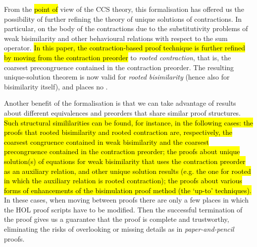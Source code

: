 From the \hl{point of} view of the CCS theory, this formalisation has offered us the possibility of
further refining the theory of unique solutions of contractions.
In particular,  on the body of the contractions due to the
substitutivity problems of weak bisimilarity and other behavioural relations with respect
to the sum operator.
\hl{In this paper, the contraction-based proof technique is further
refined by moving from the contraction preorder} to
\emph{rooted contraction}, that is, the coarsest precongruence contained in the contraction
preorder. The resulting unique-solution theorem is now valid for
\emph{rooted bisimilarity} (hence also for bisimilarity itself), and places no 
.

Another benefit of the formalisation is 
that we can take advantage of results about different 
equivalences and preorders that share similar proof structures.
\hl{Such structural simililarities can be found, for instance, in the
following cases: the proofs that rooted bisimilarity and rooted
contraction are, respectively, the coarsest congruence contained in
weak bisimilarity and the coarsest precongruence contained in the
contraction preorder; the proofs about unique solution(s) of equations
for weak bisimilarity that uses the contraction preorder as an
auxiliary relation, and other unique solution results (e.g. the one
for rooted in which the auxiliary relation is rooted contraction); the
proofs about various forms of enhancements of the bisimulation proof
method (the `up-to' techniques).}
%
In these cases, when moving between proofs there are only a few places in
which the HOL proof scripts have to be modified.
Then the successful termination of the proof gives us a guarantee that the proof is
complete and trustworthy, eliminating the risks 
of overlooking or missing details as in \emph{paper-and-pencil} proofs.






